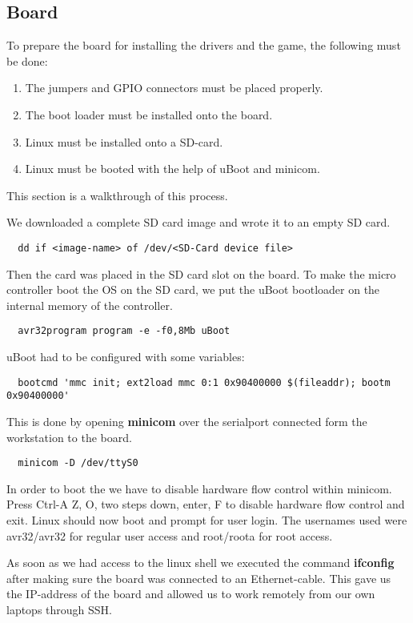 \subsection{Board}
\label{sec:boardsetup}

To prepare the board for installing the drivers and the game, the following must be done:
\begin{enumerate}
  \item The jumpers and GPIO connectors must be placed properly.
  \item The boot loader must be installed onto the board.
  \item Linux must be installed onto a SD-card.
  \item Linux must be booted with the help of uBoot and minicom.
\end{enumerate}

This section is a walkthrough of this process.

We downloaded a complete SD card image and wrote it to an empty SD card.
\begin{verbatim}
  dd if <image-name> of /dev/<SD-Card device file>
\end{verbatim}
Then the card was placed in the SD card slot on the board. To make the micro controller boot
the OS on the SD card, we put the uBoot bootloader on the internal memory of the controller.
\begin{verbatim}
  avr32program program -e -f0,8Mb uBoot
\end{verbatim}
uBoot had to be configured with some variables:
\begin{verbatim}
  bootcmd 'mmc init; ext2load mmc 0:1 0x90400000 $(fileaddr); bootm 0x90400000'
\end{verbatim}
This is done by opening {\bf minicom} over the serialport connected form the workstation to the board.
\begin{verbatim}
  minicom -D /dev/ttyS0
\end{verbatim}
In order to boot the we have to disable hardware flow control within minicom.
Press Ctrl-A Z, O, two steps down, enter, F to disable hardware flow control and exit.
Linux should now boot and prompt for user login. The usernames used were avr32/avr32 for
regular user access and root/roota for root access.

As soon as we had access to the linux shell we executed the command {\bf ifconfig} after
making sure the board was connected to an Ethernet-cable. This gave us the IP-address of the
board and allowed us to work remotely from our own laptops through SSH.

